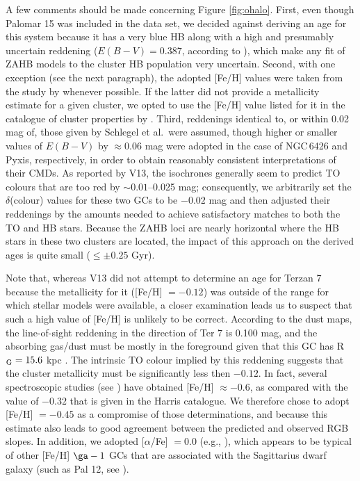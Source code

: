 \documentclass[useAMS,usenatbib]{mn2e}
\begin{document}
A few comments should be made concerning Figure \ref{fig:ohalo}.  First, even
though Palomar 15 was included in the \cite{Dotter11} data set, we decided
against deriving an age for this system because it has a very blue HB along with
a high and presumably uncertain reddening ($E(B-V) = 0.387$, according to
\citealt{SFD98}), which make any fit of ZAHB models to the cluster HB population
very uncertain.  Second, with one exception (see the next paragraph), the
adopted [Fe/H] values were taken from the study by \citet{CG09} whenever
possible.  If the latter did not provide a metallicity estimate for a given
cluster, we opted to use the [Fe/H] value listed for it in the catalogue of
cluster properties by \cite{Harris10}.  Third, reddenings identical
to, or within 0.02 mag of, those given by Schlegel et al.~were assumed, though
higher or smaller values of $E(B-V)$ by $\approx 0.06$ mag were adopted in the
case of NGC$\,$6426 and Pyxis, respectively, in order to obtain reasonably
consistent interpretations of their CMDs.  As reported by V13, the isochrones
generally seem to predict TO colours that are too red by $\sim 0.01$--0.025 mag;
consequently, we arbitrarily set the $\delta$(colour) values for these two GCs
to be $-0.02$ mag and then adjusted their reddenings by the amounts needed to
achieve satisfactory matches to both the TO and HB stars.  Because the ZAHB
loci are nearly horizontal where the HB stars in these two clusters are located,
the impact of this approach on the derived ages is quite small ($\leq \pm 0.25$
Gyr).

Note that, whereas V13 did not attempt to determine an age for Terzan 7 because
the \citet{CG09} metallicity for it ([Fe/H] $= -0.12$) was outside of the
range for which stellar models were available, a closer examination leads us to
suspect that such a high value of [Fe/H] is unlikely to be correct.  According
to the \cite{SFD98} dust maps, the line-of-sight reddening in the
direction of Ter 7 is 0.100 mag, and the absorbing gas/dust must be mostly in
the foreground given that this GC has R$_{\rm G} = 15.6$ kpc \citep{Harris10}.
The intrinsic TO colour implied by this reddening suggests that the cluster
metallicity must be significantly less then $-0.12$.  In fact, several
spectroscopic studies (see \citealt[and references therein]{Pritzl05}) have
obtained [Fe/H] $\approx -0.6$, as compared with the value of $-0.32$ that is
given in the Harris catalogue.   We therefore chose to adopt [Fe/H] $= -0.45$ as 
a compromise of those determinations, and because this estimate also leads to
good agreement between the predicted and observed RGB slopes.  In addition,
we adopted [$\alpha$/Fe] $=0.0$ (e.g., \citealt{Taut04}), which appears to be
typical of other [Fe/H] $\ga -1$ GCs that are associated with the
Sagittarius dwarf galaxy (such as Pal 12, see \citealt{Cohen04}).
\end{document}
